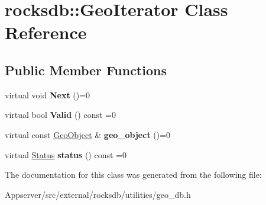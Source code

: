 \hypertarget{classrocksdb_1_1GeoIterator}{}\section{rocksdb\+:\+:Geo\+Iterator Class Reference}
\label{classrocksdb_1_1GeoIterator}
\subsection*{Public Member Functions}
\begin{DoxyCompactItemize}
\item 
virtual void {\bfseries Next} ()=0\hypertarget{classrocksdb_1_1GeoIterator_aea522ef4d34543506cd7249edc2ded26}{}\label{classrocksdb_1_1GeoIterator_aea522ef4d34543506cd7249edc2ded26}

\item 
virtual bool {\bfseries Valid} () const =0\hypertarget{classrocksdb_1_1GeoIterator_ae3894cef3836f41b5580aa195a1f2c83}{}\label{classrocksdb_1_1GeoIterator_ae3894cef3836f41b5580aa195a1f2c83}

\item 
virtual const \hyperlink{classrocksdb_1_1GeoObject}{Geo\+Object} \& {\bfseries geo\+\_\+object} ()=0\hypertarget{classrocksdb_1_1GeoIterator_adbf68aacb1401b97006a660b723488f5}{}\label{classrocksdb_1_1GeoIterator_adbf68aacb1401b97006a660b723488f5}

\item 
virtual \hyperlink{classrocksdb_1_1Status}{Status} {\bfseries status} () const =0\hypertarget{classrocksdb_1_1GeoIterator_a71220bc36b86557e1043dd2e8453b969}{}\label{classrocksdb_1_1GeoIterator_a71220bc36b86557e1043dd2e8453b969}

\end{DoxyCompactItemize}


The documentation for this class was generated from the following file\+:\begin{DoxyCompactItemize}
\item 
Appserver/src/external/rocksdb/utilities/geo\+\_\+db.\+h\end{DoxyCompactItemize}
